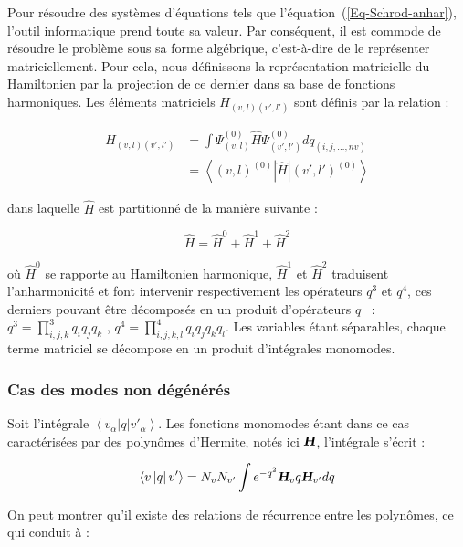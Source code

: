 Pour résoudre des systèmes d'équations tels que l'équation~(\ref{Eq-Schrod-anhar}), l'outil informatique prend toute sa valeur. Par conséquent, il est commode de résoudre le problème sous sa forme algébrique, c'est-à-dire de le représenter matriciellement. Pour cela, nous définissons la représentation matricielle du Hamiltonien par la projection de ce dernier dans sa base de fonctions harmoniques. Les éléments matriciels $H_{(v,l)(v',l')}$ sont définis par la relation :

\begin{align}
H_{(v,l)(v',l')} &= \int \Psi^{(0)}_{(v,l)} \hat{H} \Psi^{(0)}_{(v',l')}dq_{(i,j,\ldots ,nv)} \\
&= \left\langle (v,l)^{(0)}\right| \hat{H} \left| (v',l')^{(0)} \right\rangle 
\end{align}

\noindent dans laquelle $\hat{H}$ est partitionné de la manière suivante : 

\begin{equation}
\hat{H} = \hat{H}^0 + \hat{H}^1 + \hat{H}^2 
\end{equation}

\noindent où $\hat{H}^0$ se rapporte au Hamiltonien harmonique, $\hat{H}^1$ et $\hat{H}^2$ traduisent l'anharmonicité et font intervenir respectivement les opérateurs $q^3$ et $q^4$, ces derniers pouvant être décomposés en un produit d'opérateurs $q$~\cite{barchewitz1961spectroscopie} : $q^3 = \displaystyle{\prod^3_{i,j,k}q_iq_jq_k}$ , $q^4 = \displaystyle{\prod^4_{i,j,k,l}q_iq_jq_kq_l}$.
Les variables étant séparables, chaque terme matriciel se décompose en un produit d'intégrales monomodes.

\subsubsection*{Cas des modes non dégénérés}

Soit l'intégrale $\left\langle v_{\alpha}\left|q \right|v'_{\alpha} \right\rangle$. Les fonctions monomodes étant dans ce cas caractérisées par des polynômes d'Hermite, notés ici $\textsl{\textbf{H}}$, l'intégrale s'écrit :

\begin{equation}
\left\langle v \left|q \right|v' \right\rangle = N_v N_{v'} \int e^{-q^2} \textsl{\textbf{H}}_v q \textsl{\textbf{H}}_{v'} dq
\end{equation}

On peut montrer qu'il existe des relations de récurrence entre les polynômes, ce qui conduit à \cite{wilson1955molecular} :


